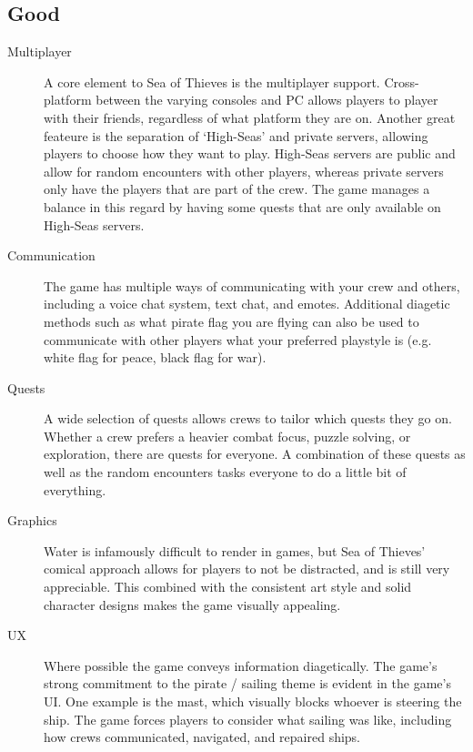 \documentclass{article}
\begin{document}
\subsection{Good}
\begin{description}
      \item[Multiplayer] A core element to Sea of Thieves is the multiplayer
            support. Cross-platform between the varying consoles and PC allows players
            to player with their friends, regardless of what platform they are
            on. Another great feateure is the separation of `High-Seas' and
            private servers, allowing players to choose how they want to play.
            High-Seas servers are public and allow for random encounters with
            other players, whereas private servers only have the players that
            are part of the crew. The game manages a balance in this regard by
            having some quests that are only available on High-Seas servers.
      \item[Communication] The game has multiple ways of communicating with your
            crew and others, including a voice chat system, text chat, and
            emotes. Additional diagetic methods such as what pirate flag you are
            flying can also be used to communicate with other players what your
            preferred playstyle is (e.g. white flag for peace, black flag for
            war).
      \item[Quests] A wide selection of quests allows crews to tailor which
            quests they go on. Whether a crew prefers a heavier combat focus, puzzle
            solving, or exploration, there are quests for everyone. A
            combination of these quests as well as the random encounters tasks
            everyone to do a little bit of everything.
      \item[Graphics] Water is infamously difficult to render in games, but Sea
            of Thieves' comical approach allows for players to not be distracted, and
            is still very appreciable. This combined with the consistent art style and
            solid character designs makes the game visually appealing.
      \item[UX] Where possible the game conveys information diagetically. The
            game's strong commitment to the pirate / sailing theme is evident in the
            game's UI. One example is the mast, which visually blocks whoever is
            steering the ship. The game forces players to consider what sailing
            was like, including how crews communicated, navigated, and repaired ships.
\end{description}
\end{document}
